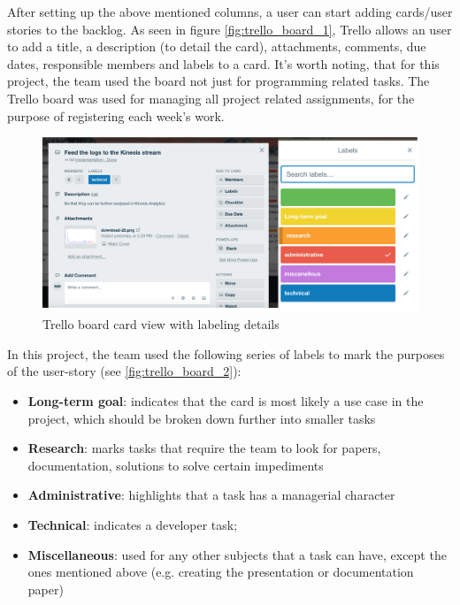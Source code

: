 After setting up the above mentioned columns, a user can start adding cards/user stories to the backlog. As seen in figure \ref{fig:trello_board_1}, Trello allows an user to add a title, a description (to detail the card), attachments, comments, due dates, responsible members and labels to a card.
It's worth noting, that for this project, the team used the board not just for programming related tasks. The Trello board was used for managing all project related assignments, for the purpose of registering each week's work.
\begin{figure}
    \centering
    \includegraphics[width=1\textwidth]{images/card-view.png}
    \caption{Trello board card view with labeling details }
    \label{fig:fig:trello_board_2}
\end{figure}
In this project, the team used the following series of labels to mark the purposes of the user-story (see \ref{fig:trello_board_2}):
    \begin{itemize}
    \item \textbf{Long-term goal}: indicates that the card is most likely a use case in the project, which should be broken down further into smaller tasks
    \item \textbf{Research}: marks tasks that require the team to look for papers, documentation, solutions to solve certain impediments
    \item \textbf{Administrative}: highlights that a task has a managerial character
    \item \textbf{Technical}: indicates a developer task;
    \item \textbf{Miscellaneous}: used for any other subjects that a task can have, except the ones mentioned above (e.g. creating the presentation or documentation paper)
\end{itemize}
    